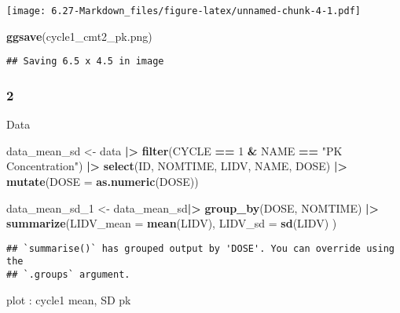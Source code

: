 \documentclass[
]{article}
\newenvironment{Shaded}{\begin{snugshade}}{\end{snugshade}}
\newcommand{\AttributeTok}[1]{\textcolor[rgb]{0.13,0.29,0.53}{#1}}
\newcommand{\DecValTok}[1]{\textcolor[rgb]{0.00,0.00,0.81}{#1}}
\newcommand{\FunctionTok}[1]{\textcolor[rgb]{0.13,0.29,0.53}{\textbf{#1}}}
\newcommand{\NormalTok}[1]{#1}
\newcommand{\OtherTok}[1]{\textcolor[rgb]{0.56,0.35,0.01}{#1}}
\newcommand{\SpecialCharTok}[1]{\textcolor[rgb]{0.81,0.36,0.00}{\textbf{#1}}}
\newcommand{\StringTok}[1]{\textcolor[rgb]{0.31,0.60,0.02}{#1}}
\begin{document}
\texttt{[image: 6.27-Markdown\_files/figure-latex/unnamed-chunk-4-1.pdf]}

\begin{Shaded}
\begin{Highlighting}[]
\FunctionTok{ggsave}\NormalTok{(}\StringTok{\textquotesingle{}cycle1\_cmt2\_pk.png\textquotesingle{}}\NormalTok{)}
\end{Highlighting}
\end{Shaded}

\begin{verbatim}
## Saving 6.5 x 4.5 in image
\end{verbatim}

\hypertarget{section-2}{%
\subsubsection{2}\label{section-2}}

Data

\begin{Shaded}
\begin{Highlighting}[]
\NormalTok{ data\_mean\_sd }\OtherTok{\textless{}{-}}\NormalTok{ data }\SpecialCharTok{|\textgreater{}}
  \FunctionTok{filter}\NormalTok{(CYCLE }\SpecialCharTok{==} \DecValTok{1} \SpecialCharTok{\&}\NormalTok{ NAME }\SpecialCharTok{==} \StringTok{"PK Concentration"}\NormalTok{) }\SpecialCharTok{|\textgreater{}}
  \FunctionTok{select}\NormalTok{(ID, NOMTIME, LIDV, NAME, DOSE) }\SpecialCharTok{|\textgreater{}}
  \FunctionTok{mutate}\NormalTok{(}\AttributeTok{DOSE =} \FunctionTok{as.numeric}\NormalTok{(DOSE))}

\NormalTok{data\_mean\_sd\_1 }\OtherTok{\textless{}{-}}\NormalTok{ data\_mean\_sd}\SpecialCharTok{|\textgreater{}}
  \FunctionTok{group\_by}\NormalTok{(DOSE, NOMTIME) }\SpecialCharTok{|\textgreater{}}
   \FunctionTok{summarize}\NormalTok{(}\AttributeTok{LIDV\_mean =} \FunctionTok{mean}\NormalTok{(LIDV),}
             \AttributeTok{LIDV\_sd =} \FunctionTok{sd}\NormalTok{(LIDV)}
\NormalTok{            )}
\end{Highlighting}
\end{Shaded}

\begin{verbatim}
## `summarise()` has grouped output by 'DOSE'. You can override using the
## `.groups` argument.
\end{verbatim}

plot : cycle1 mean, SD pk
\end{document}
